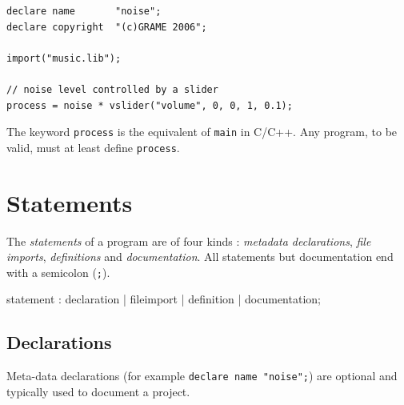 \begin{lstlisting}
declare name       "noise";
declare copyright  "(c)GRAME 2006";

import("music.lib");

// noise level controlled by a slider
process = noise * vslider("volume", 0, 0, 1, 0.1);
\end{lstlisting}
 
The keyword \lstinline'process' is the equivalent of \lstinline'main' in C/C++. Any \faust program, to be valid, must at least define \lstinline'process'.

\section{Statements}

The \textit{statements} of a \faust program are of four kinds : \textit{metadata declarations}, \textit{file imports},  \textit{definitions} and \textit{documentation}. All statements but documentation end with a semicolon (\lstinline';'). 
% 

\begin{rail}
statement : declaration | fileimport | definition | documentation;
\end{rail}

\subsection{Declarations}

Meta-data declarations (for example \lstinline'declare name "noise";') are optional and typically used to document a \faust project. 

% 

